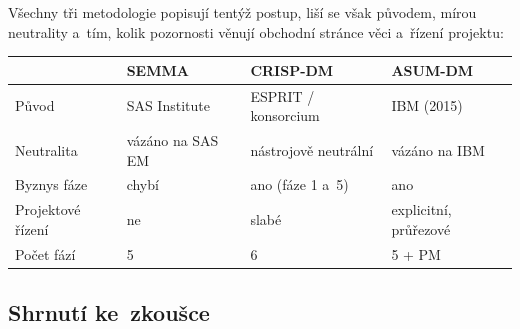 \documentclass[11pt,a4paper]{article}
\theoremstyle{definition}
\begin{document}
Všechny tři metodologie popisují tentýž postup, liší se však původem, mírou neutrality
a~tím, kolik pozornosti věnují obchodní stránce věci a~řízení projektu:

\begin{center}
\small
\begin{tabular}{@{}llll@{}}
\toprule
& \textbf{SEMMA} & \textbf{CRISP-DM} & \textbf{ASUM-DM} \\
\midrule
Původ & SAS Institute & ESPRIT / konsorcium & IBM (2015) \\
Neutralita & vázáno na SAS EM & nástrojově neutrální & vázáno na IBM \\
Byznys fáze & chybí & ano (fáze 1 a~5) & ano \\
Projektové řízení & ne & slabé & explicitní, průřezové \\
Počet fází & 5 & 6 & 5 + PM \\
\bottomrule
\end{tabular}
\end{center}

\subsection{Shrnutí ke~zkoušce}
\end{document}

